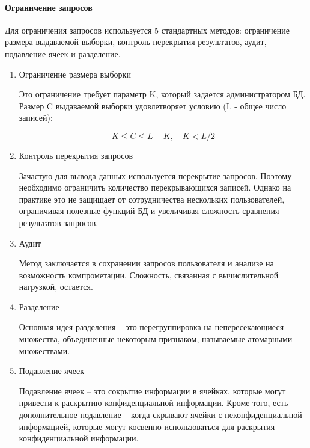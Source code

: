 \paragraph{Ограничение запросов}

Для ограничения запросов используется 5 стандартных методов: ограничение размера выдаваемой выборки, контроль перекрытия результатов, аудит, подавление ячеек и разделение.

\begin{enumerate}

  \item Ограничение размера выборки

Это ограничение требует параметр K, который задается администратором БД. Размер C выдаваемой выборки удовлетворяет условию (L - общее число записей):

\begin{displaymath}
K \leq C \leq L - K, \quad K < L/2
\end{displaymath}

  \item Контроль перекрытия запросов

Зачастую для вывода данных используется перекрытие запросов. Поэтому необходимо ограничить количество перекрывающихся записей. Однако на практике это не защищает от сотрудничества нескольких пользователей, ограничивая полезные функций БД и увеличивая сложность сравнения результатов запросов.

  \item Аудит

Метод заключается в сохранении запросов пользователя и анализе на возможность компрометации. Сложность, связанная с вычислительной нагрузкой, остается.

  \item Разделение

Основная идея разделения -- это перегруппировка на непересекающиеся множества, объединенные некоторым признаком, называемые атомарными множествами.

  \item Подавление ячеек

Подавление ячеек -- это сокрытие информации в ячейках, которые могут привести к раскрытию конфиденциальной информации. Кроме того, есть дополнительное подавление -- когда скрывают ячейки с неконфиденциальной информацией, которые могут косвенно использоваться для раскрытия конфиденциальной информации.

\end{enumerate}

